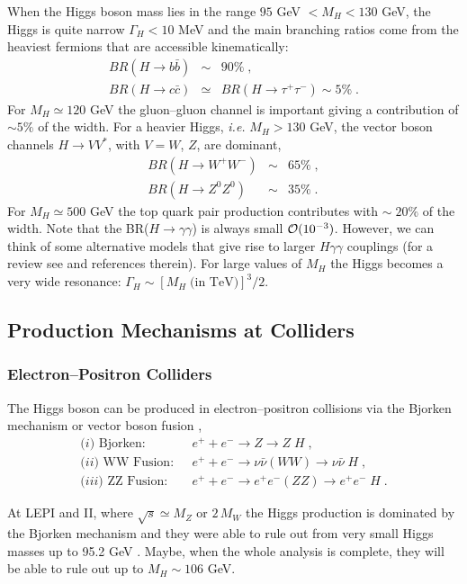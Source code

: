 \documentclass[12pt]{report}
\newcommand{\ba}{\begin{array}}
\newcommand{\ea}{\end{array}}
\begin{document}
When the Higgs boson mass lies in the range $95$ GeV $< M_H < 130$
GeV, the Higgs is quite narrow $\Gamma_H < 10$ MeV and the main
branching ratios come from the heaviest fermions that are accessible
kinematically:
\begin{eqnarray*}
BR(H \to b \bar{b}) &\sim &  90   \% \; , \\
BR(H \to c \bar{c}) &\simeq & BR(H \to \tau^+ \tau^-) \sim  5   \% \; .
\end{eqnarray*}
For $M_H \simeq 120$ GeV the gluon--gluon channel is important
giving  a contribution of $\sim 5 \%$ of the width. For a heavier
Higgs, {\it i.e.} $M_H > 130$ GeV, the vector boson channels $H \to V
V^\ast$, with $V = W$, $Z$, are dominant, 
\begin{eqnarray*}
BR(H \to W^+ W^-) & \sim & 65 \% \; ,\\
BR(H \to Z^0 Z^0) & \sim & 35 \% \; .
\end{eqnarray*}
For $M_H \simeq 500$ GeV the top quark pair production contributes
with $\sim \; 20 \%$ of the width. Note that the BR($H \to
\gamma\gamma$) is always small ${\cal O}(10^{-3})$. However, we can
think of some alternative models that give rise to larger
$H\gamma\gamma$ couplings (for a review see \cite{Concha:99} and
references therein).  For large values of $M_H$ the Higgs becomes a
very wide resonance: $\Gamma_H \sim [M_H \; \mbox{(in TeV)}]^3/2$. 


\subsection{Production Mechanisms at Colliders}

\subsubsection{Electron--Positron Colliders}\indent

The Higgs boson can be produced in electron--positron collisions via
the Bjorken mechanism \cite{Bjorken:76} or vector boson fusion
\cite{Cahn:84},
\[
\ba{ll}
\mbox{($i$) Bjorken:} & ~~~ e^+ + e^- \to Z \to Z \; H \; , \\[0.2cm]
\mbox{($ii$) WW Fusion:}  & ~~~ e^+ + e^- \to \nu \bar{\nu}
(WW) \to \nu \bar{\nu} \;  H \; , \\[0.2cm]
\mbox{($iii$) ZZ Fusion:}		& ~~~ e^+ + e^- \to e^+ e^- (ZZ) \to 
e^+ e^- \;  H  \; .
\ea 
\]

At LEPI and II, where $\sqrt{s} \simeq M_Z$ or $2 \, M_W$ the Higgs
production is dominated by the Bjorken mechanism and they were able
to rule out from very small Higgs masses up to 95.2 GeV
\cite{Higgs:99}. Maybe, when the whole analysis is complete, they will
be able to rule out up to $M_H \sim 106$ GeV. 
\end{document}
